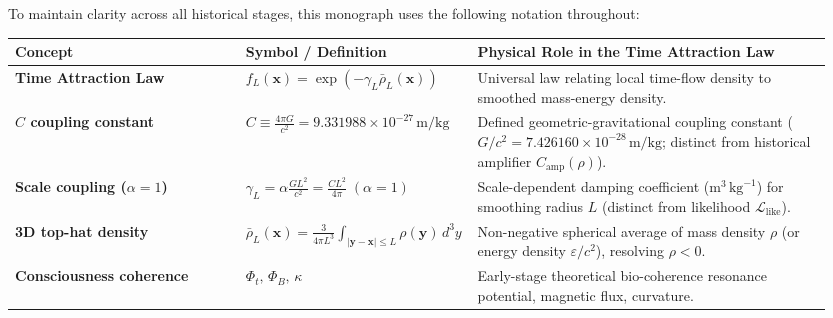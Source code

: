 \documentclass[10pt,a4paper]{article}
\begin{document}
\vspace{1.5mm}
\par
To maintain clarity across all historical stages, this monograph uses the following notation throughout:
\begin{center}\vspace{-2pt}
{\footnotesize
\begin{tabular}{@{}>{\bfseries}p{0.28\linewidth}p{0.24\linewidth}p{0.43\linewidth}@{}}
\toprule
Concept & Symbol / Definition & Physical Role in the Time Attraction Law \\
\midrule
Time Attraction Law & $f_L(\mathbf{x}) = \exp(-\gamma_L \bar{\rho}_L(\mathbf{x}))$ & Universal law relating local time-flow density to smoothed mass-energy density. \\
$C$ coupling constant & $C \equiv \frac{4\pi G}{c^2} = 9.331988\times 10^{-27}\,\text{m/kg}$ & Defined geometric-gravitational coupling constant ($G/c^2 = 7.426160\times 10^{-28}\,\text{m/kg}$; distinct from historical amplifier $C_{\text{amp}}(\rho)$). \\
Scale coupling ($\alpha=1$) & $\gamma_L = \alpha\frac{G L^2}{c^2} = \frac{C L^2}{4\pi}\;(\alpha=1)$ & Scale-dependent damping coefficient ($\text{m}^3\,\text{kg}^{-1}$) for smoothing radius $L$ (distinct from likelihood $\mathcal{L}_{\text{like}}$). \\
3D top-hat density & $\bar{\rho}_L(\mathbf{x}) = \frac{3}{4\pi L^3}\int_{|\mathbf{y}-\mathbf{x}|\le L}\rho(\mathbf{y})\,d^3y$ & Non-negative spherical average of mass density $\rho$ (or energy density $\varepsilon/c^2$), resolving $\rho<0$. \\
Consciousness coherence & $\Phi_t,\,\Phi_B,\,\kappa$ & Early-stage theoretical bio-coherence resonance potential, magnetic flux, curvature. \\
\bottomrule
\end{tabular}}
\end{center}
\end{document}
